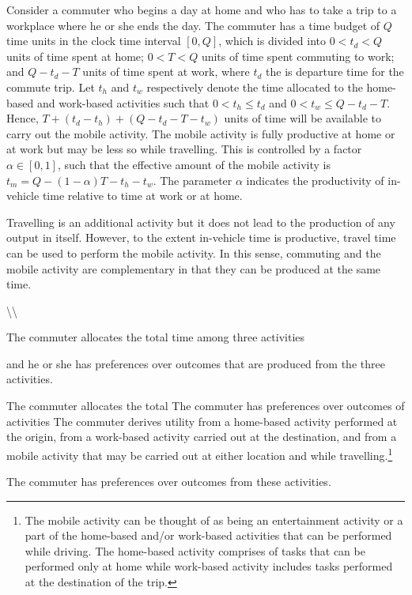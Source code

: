 \documentclass[12pt,a4paper,british]{article}
\theoremstyle{definition}
\theoremstyle{plain}
\theoremstyle{plain}
\begin{document}
Consider a commuter who begins a day at home and who has to take a trip to a workplace where he or she ends the day. The commuter has a time budget of $Q$ time units in the clock time interval $\left[0,Q\right]$, which is divided into $0<t_{d}<Q$ units of time spent at home; $0<T<Q$ units of time spent commuting to work; and $Q-t_{d}-T$ units of time spent at work, where $t_{d}$ the is departure time for the commute trip. Let $t_{h}$ and $t_{w}$ respectively denote the time allocated to the home-based and work-based activities such that $0<t_{h}\leq t_{d}$ and $0<t_{w}\leq Q-t_{d}-T$. Hence, $T+\left(t_{d}-t_{h}\right)+\left(Q-t_{d}-T-t_{w}\right)$ units of time will be available to carry out the mobile activity. The mobile activity is fully productive at home or at work but may be less so while travelling. This is controlled by a factor $\alpha\in\left[0,1\right]$, such that the effective amount of the mobile activity is $t_{m}=Q-\left(1-\alpha\right)T-t_{h}-t_{w}$. The parameter $\alpha$ indicates the productivity of in-vehicle time
relative to time at work or at home.

Travelling is an additional activity but it does not lead to the production of any output in itself. However, to the extent in-vehicle time is productive, travel time can be used to perform the mobile activity. In this sense, commuting and the mobile activity are complementary in that they can be produced at the same time.

\textbackslash\textbackslash{}

The commuter allocates the total time among three activities

and he or she has preferences over outcomes that are produced from the three activities.

The commuter allocates the total The commuter has preferences over outcomes of activities The commuter derives utility from a home-based
activity performed at the origin, from a work-based activity carried out at the destination, and from a mobile activity that may be carried out at either location and while travelling.\footnote{The mobile activity can be thought of as being an entertainment activity or a part of the home-based and/or work-based activities that can be performed while driving. The home-based activity comprises of tasks that can be performed only at home while work-based activity includes tasks performed at the destination of the trip.}

The commuter has preferences over outcomes from these activities.
\end{document}
